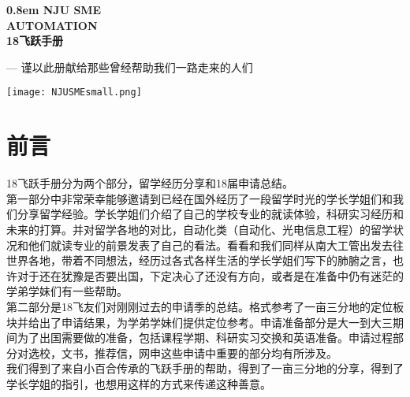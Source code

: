 \documentclass[a4paper,UTF8]{book}
\begin{document}
\newcommand\nbvspace[1][3]{\vspace*{\stretch{#1}}}
\newcommand\nbstretchyspace{\spaceskip0.5em plus 0.25em minus 0.25em}
\newcommand{\nbtitlestretch}{\spaceskip0.8em}
\pagestyle{empty}
\begin{center}
\bfseries
\nbvspace[1]
\Huge
{\nbtitlestretch
\fontsize{63pt}{18pt}\selectfont
NJU SME\\
\nbvspace[0.1]
\fontsize{40pt}{30pt}\selectfont
AUTOMATION\\
\nbvspace[0.1]
\fontsize{40pt}{18pt}\selectfont
18飞跃手册}

\nbvspace[0.5]
\fontsize{14pt}{18pt}\selectfont
{--- 谨以此册献给那些曾经帮助我们一路走来的人们}

\nbvspace[1]

\texttt{[image: NJUSMEsmall.png]}
\nbvspace[0.5]
\normalsize

\end{center}



\tableofcontents %
\pagestyle{fancy}

\fancyhf{}
\fancyhead[EL,OR]{\subsectionmark}
\fancyfoot[EC,OC]{\thepage}
\fancyhead[ER,OL]{\nouppercase{\leftmark}-\nouppercase{\rightmark}}
\renewcommand{\chaptermark}[1]{\markboth{#1}{}}
\renewcommand{\sectionmark}[1]{\markright{#1}{}}
\chapter{前言}

{\begin{spacing}{1.5}
\fontsize{12pt}{12pt}\selectfont
18飞跃手册分为两个部分，留学经历分享和18届申请总结。\\

第一部分中非常荣幸能够邀请到已经在国外经历了一段留学时光的学长学姐们和我们分享留学经验。学长学姐们介绍了自己的学校专业的就读体验，科研实习经历和未来的打算。并对留学各地的对比，自动化类（自动化、光电信息工程）的留学状况和他们就读专业的前景发表了自己的看法。看看和我们同样从南大工管出发去往世界各地，带着不同想法，经历过各式各样生活的学长学姐们写下的肺腑之言，也许对于还在犹豫是否要出国，下定决心了还没有方向，或者是在准备中仍有迷茫的学弟学妹们有一些帮助。\\

第二部分是18飞友们对刚刚过去的申请季的总结。格式参考了一亩三分地的定位板块并给出了申请结果，为学弟学妹们提供定位参考。申请准备部分是大一到大三期间为了出国需要做的准备，包括课程学期、科研实习交换和英语准备。申请过程部分对选校，文书，推荐信，网申这些申请中重要的部分均有所涉及。\\

我们得到了来自小百合传承的飞跃手册的帮助，得到了一亩三分地的分享，得到了学长学姐的指引，也想用这样的方式来传递这种善意。

\end{spacing}
}
\end{document}
